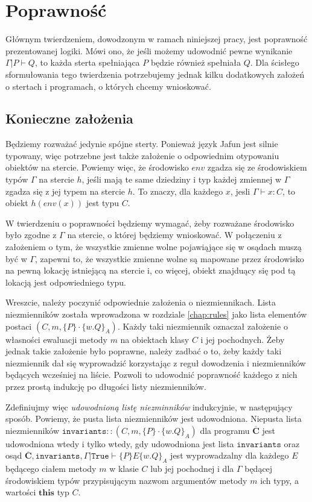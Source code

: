\documentclass[]{pracamgr}
\newcommand \hoare [5] {\{#1\}#2\{#4.#5\}_#3}
\renewcommand \| {\hspace{0.75em} | \hspace{0.75em} }
\renewcommand \[ {[\![}
\renewcommand \] {]\!]}
\theoremstyle{definition}
\newcommand{\jthis}{\textbf{this}\xspace}
\begin{document}
\chapter{Poprawność}
Głównym twierdzeniem, dowodzonym w ramach niniejszej pracy, jest poprawność prezentowanej logiki.
Mówi ono, że jeśli możemy udowodnić pewne wynikanie $\Gamma | P \vdash Q$,
to każda sterta spełniająca $P$ będzie również spełniała $Q$.
Dla ścisłego sformułowania tego twierdzenia potrzebujemy jednak kilku dodatkowych założeń o stertach
i programach, o których chcemy wnioskować.

\section{Konieczne założenia}
Będziemy rozważać jedynie spójne sterty. Ponieważ język Jafun jest silnie typowany, więc potrzebne
jest także założenie o odpowiednim otypowaniu obiektów na stercie.
Powiemy więc, że środowisko $\mathit{env}$ zgadza się ze środowiskiem typów $\Gamma$ na stercie $h$,
jeśli mają te same dziedziny i typ każdej zmiennej w $\Gamma$ zgadza się z jej typem na stercie $h$.
To znaczy, dla każdego $x$, jesli $\Gamma \vdash x : C$, to obiekt $h(\mathit{env}(x))$ jest typu $C$.

W twierdzeniu o poprawności będziemy wymagać, żeby rozważane środowisko było zgodne z $\Gamma$
na stercie, o której będziemy wnioskować. W połączeniu z założeniem o tym, że wszystkie zmienne wolne
pojawiąjące się w osądach muszą być w $\Gamma$, zapewni to, że wszystkie zmienne wolne są mapowane
przez środowisko na pewną lokację istniejącą na stercie i, co więcej, obiekt znajduący się pod tą
lokacją jest odpowiedniego typu.

Wreszcie, należy poczynić odpowiednie założenia o niezmiennikach.
Lista niezmienników została wprowadzona w rozdziale \ref{chap:rules} jako lista elementów postaci
$(C, m, \hoare{P}{\cdot}{A}{w}{Q})$.
Każdy taki niezmiennik oznaczał założenie o własności ewaluacji metody $m$ na obiektach klasy
$C$ i jej pochodnych.
Żeby jednak takie założenie było poprawne, należy zadbać o to, żeby każdy taki niezmiennik dał
się wyprowadzić korzystając z reguł dowodzenia i niezmienników będących wcześniej na liście.
Pozwoli to udowodnić poprawność każdego z nich przez prostą indukcję po długości listy niezmienników.

Zdefiniujmy więc \textit{udowodnioną listę niezminników} indukcyjnie, w następujący sposób.
Powiemy, że pusta lista niezmienników jest udowodniona.
Niepusta lista niezmienników $\mathtt{invariants}::(C, m, \hoare{P}{\cdot}{A}{w}{Q})$ dla
programu $\overline{\mathbf{C}}$ jest
udowodniona wtedy i tylko wtedy, gdy udowodniona jest lista $\mathtt{invariants}$ oraz osąd
$\overline{\mathbf{C}}, \mathtt{invariants}, \Gamma | \mathtt{True} \vdash \hoare{P}{E}{A}{w}{Q}$
jest wyprowadzalny dla każdego $E$ będącego ciałem metody $m$ w klasie $C$ lub jej pochodnej i
dla $\Gamma$ będącej środowiskiem typów przypisującym nazwom argumentów metody
$m$ ich typy, a wartości $\jthis$ typ $C$.
\end{document}
